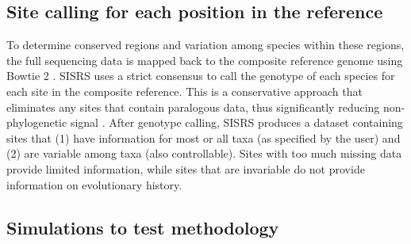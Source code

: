 \documentclass[11pt, oneside]{article}   	%
\begin{document}
\subsection{Site calling for each position in the reference}
To determine conserved regions and variation among species within these regions, the full sequencing data is mapped back to the composite reference genome using Bowtie 2 \citep{Langmead2012}.
SISRS uses a strict consensus to call the genotype of each species for each site in the composite reference.
This is a conservative approach that eliminates any sites that contain paralogous data, thus significantly reducing non-phylogenetic signal \citep{Philippe2011}. 
After genotype calling, SISRS produces a dataset containing sites that (1) have information for most or all taxa (as specified by the user) and (2) are variable among taxa (also controllable). 
Sites with too much missing data provide limited information, while sites that are invariable do not provide information on evolutionary history.


\subsection{Simulations to test methodology}
\end{document}
